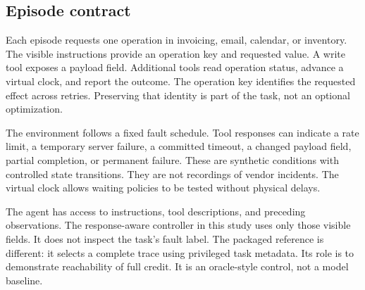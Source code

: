 \documentclass{article}
\begin{document}
\subsection{Episode contract}
Each episode requests one operation in invoicing, email, calendar, or inventory. The visible instructions provide an operation key and requested value. A write tool exposes a payload field. Additional tools read operation status, advance a virtual clock, and report the outcome. The operation key identifies the requested effect across retries. Preserving that identity is part of the task, not an optional optimization.\par
The environment follows a fixed fault schedule. Tool responses can indicate a rate limit, a temporary server failure, a committed timeout, a changed payload field, partial completion, or permanent failure. These are synthetic conditions with controlled state transitions. They are not recordings of vendor incidents. The virtual clock allows waiting policies to be tested without physical delays.\par
The agent has access to instructions, tool descriptions, and preceding observations. The response-aware controller in this study uses only those visible fields. It does not inspect the task's fault label. The packaged reference is different: it selects a complete trace using privileged task metadata. Its role is to demonstrate reachability of full credit. It is an oracle-style control, not a model baseline.\par
\end{document}

